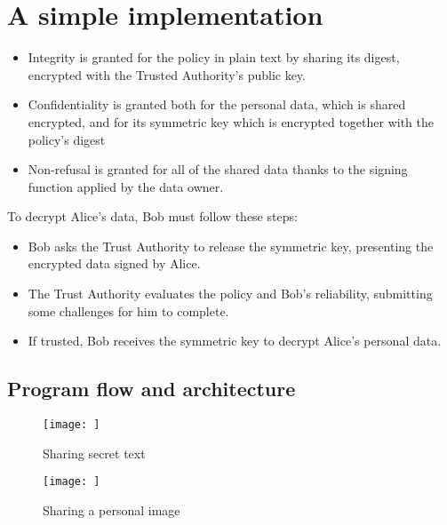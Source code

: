 \chapter{A simple implementation}
\label{chapter3}
\thispagestyle{empty}

\noindent 
\begin{itemize}
	\item Integrity is granted for the policy in plain text by sharing its digest, encrypted with the Trusted Authority's public key.
	\item Confidentiality is granted both for the personal data, which is shared encrypted, and for its symmetric key which is encrypted together with the policy's digest
	\item Non-refusal is granted for all of the shared data thanks to the signing function applied by the data owner.
\end{itemize}

To decrypt Alice's data, Bob must follow these steps:
\begin{itemize}
	\item Bob asks the Trust Authority to release the symmetric key, presenting the encrypted data signed by Alice.
	\item The Trust Authority evaluates the policy and Bob's reliability, submitting some challenges for him to complete.
	\item If trusted, Bob receives the symmetric key to decrypt Alice's personal data.
\end{itemize}


\section{Program flow and architecture}

\begin{figure}
	\centering
	\begin{minipage}{0.35\textwidth}
		\centering
		\texttt{[image: ]} %
		\caption{Sharing secret text}
		\label{fig:share-text}
	\end{minipage}
	\begin{minipage}{0.35\textwidth}
		\centering
		\texttt{[image: ]} %
		\caption{Sharing a personal image}
		\label{fig:share-img}
	\end{minipage}
\end{figure}
